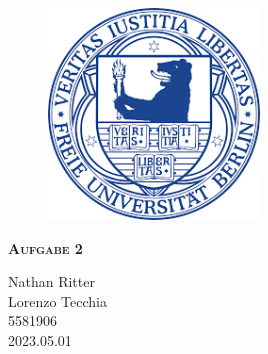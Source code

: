 \documentclass{report}
\begin{document}
\begin{center}
	
\end{center}
    \begin{figure}[htbp!]
        \begin{center}
            \includegraphics[width=0.5\textwidth]{Immagini/FUlogo.png}
        \end{center}
    \end{figure}
    
    {\centering\scshape\Large\bfseries Aufgabe 2
    \begin{center}
        Nathan Ritter  \\ 
        Lorenzo Tecchia \\ 5581906  \\ 2023.05.01
    \end{center}}


    \newpage
    
    \tableofcontents
    
    
    
    
    
\end{document}

